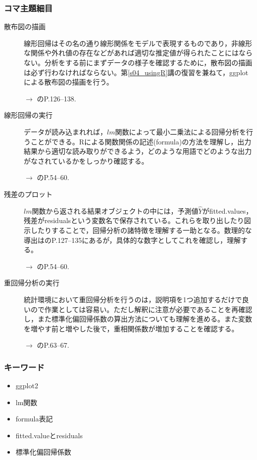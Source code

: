 \subsubsection{コマ主題細目}
\begin{description}

	\item[散布図の描画]線形回帰はその名の通り線形関係をモデルで表現するものであり，非線形な関係や外れ値の存在などがあれば適切な推定値が得られたことにはならない。分析をする前にまずデータの様子を確認するために，散布図の描画は必ず行わなければならない。第\ref{s04_usingR}講の復習を兼ねて，ggplotによる散布図の描画を行う。
	      \begin{flushright}
		      $\to$ \citet{Kinosady2021}のP.126--138.
	      \end{flushright}

	\item[線形回帰の実行]データが読み込まれれば，$lm$関数によって最小二乗法による回帰分析を行うことができる。Rによる関数関係の記述(formula)の方法を理解し，出力結果から適切な読み取りができるよう，どのような用語でどのような出力がなされているかをしっかり確認する。
	      \begin{flushright}
		      $\to$ \citet{kosugi2018}のP.54--60.
	      \end{flushright}

	\item[残差のプロット]$lm$関数から返される結果オブジェクトの中には，予測値$\hat{Y}$がfitted.values，残差がresidualsという変数名で保存されている。これらを取り出したり図示したりすることで，回帰分析の諸特徴を理解する一助となる。数理的な導出は\citet{kosugi2018}のP.127--135にあるが，具体的な数字としてこれを確認し，理解する。
	      \begin{flushright}
		      $\to$ \citet{kosugi2018}のP.54--60.
	      \end{flushright}

	\item[重回帰分析の実行]統計環境において重回帰分析を行うのは，説明項を1つ追加するだけで良いので作業としては容易い。ただし解釈に注意が必要であることを再確認し，また標準化偏回帰係数の算出方法についても理解を進める。また変数を増やす前と増やした後で，重相関係数が増加することを確認する。
	      \begin{flushright}
		      $\to$ \citet{kosugi2018}のP.63--67.
	      \end{flushright}

\end{description}
\subsubsection{キーワード}
\begin{itemize}
	\item ggplot2
	\item lm関数
	\item formula表記
	\item fitted.valueとresiduals
	\item 標準化偏回帰係数
\end{itemize}
